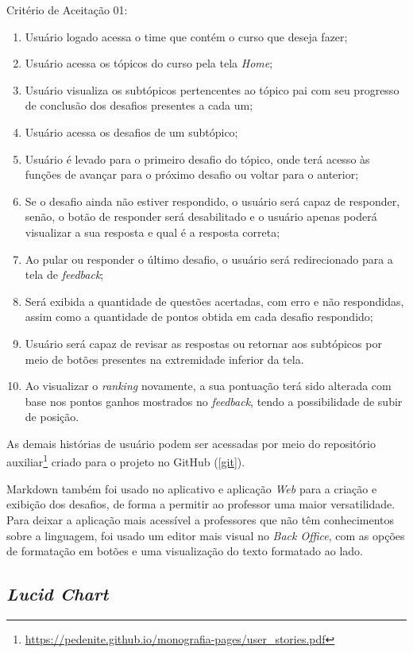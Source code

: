 Critério de Aceitação 01:
\begin{enumerate}
    \item Usuário logado acessa o time que contém o curso que deseja fazer;
    \item Usuário acessa os tópicos do curso pela tela \textit{Home};
    \item Usuário visualiza os subtópicos pertencentes ao tópico pai com seu progresso de conclusão dos desafios presentes a cada um;
    \item Usuário acessa os desafios de um subtópico;
    \item Usuário é levado para o primeiro desafio do tópico, onde terá acesso às funções de avançar para o próximo desafio ou voltar para o anterior;
    \item Se o desafio ainda não estiver respondido, o usuário será capaz de responder, senão, o botão de responder será desabilitado e o usuário apenas poderá visualizar a sua resposta e qual é a resposta correta;
    \item Ao pular ou responder o último desafio, o usuário será redirecionado para a tela de \textit{feedback};
    \item Será exibida a quantidade de questões acertadas, com erro e não respondidas, assim como a quantidade de pontos obtida em cada desafio respondido;
    \item Usuário será capaz de revisar as respostas ou retornar aos subtópicos por meio de botões presentes na extremidade inferior da tela.
    \item Ao visualizar o \textit{ranking} novamente, a sua pontuação terá sido alterada com base nos pontos ganhos mostrados no \textit{feedback}, tendo a possibilidade de subir de posição.
\end{enumerate}

As demais histórias de usuário podem ser acessadas por meio do repositório auxiliar\footnote{\url{https://pedenite.github.io/monografia-pages/user_stories.pdf}} criado para o projeto no GitHub (\ref{git}).

Markdown também foi usado no aplicativo e aplicação \textit{Web} para a criação e exibição dos desafios, de forma a permitir ao professor uma maior versatilidade. Para deixar a aplicação mais acessível a professores que não têm conhecimentos sobre a linguagem, foi usado um editor mais visual no \textit{Back Office}, com as opções de formatação em botões e uma visualização do texto formatado ao lado.

\subsection{\textit{Lucid Chart}}
\label{lucidChart}

